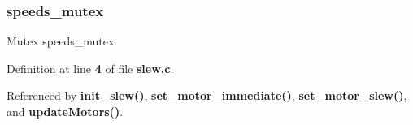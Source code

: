 \subsubsection{speeds\+\_\+mutex}
{\footnotesize\ttfamily Mutex speeds\+\_\+mutex\hspace{0.3cm}{\ttfamily [static]}}



Definition at line \textbf{ 4} of file \textbf{ slew.\+c}.



Referenced by \textbf{ init\+\_\+slew()}, \textbf{ set\+\_\+motor\+\_\+immediate()}, \textbf{ set\+\_\+motor\+\_\+slew()}, and \textbf{ update\+Motors()}.

